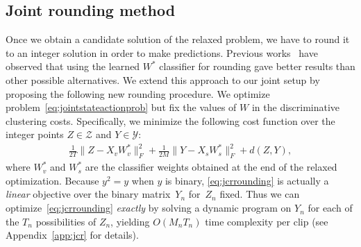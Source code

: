 \subsection{Joint rounding method}
\label{sec:rounding}
Once we obtain a candidate solution of the relaxed problem, we have to round it to an integer solution in order to make predictions.
Previous works~\cite{Alayrac15Unsupervised,Bojanowski15weakly} have observed that using the learned $W^*$ classifier for rounding gave better results than other possible alternatives. We extend this approach to our joint setup by proposing the following new rounding procedure. 
We optimize problem~\eqref{eq:jointstateactionprob} but fix the values of $W$ in the discriminative clustering costs. 
Specifically, we minimize the following cost function over the integer points $Z\in \mathcal{Z}$ and $Y \in \mathcal{Y}$:
\begin{align}
\label{eq:jcrrounding}
\!\!\!\!\!\frac{1}{2T} \|Z - X_{v} W^*_{v}\|_F^2 +  \frac{1}{2M} \|Y - X_{s} W^*_{s}\|_F^2 +  d(Z, Y), \!\!
\end{align}
where $W^*_{v}$ and $W^*_{s}$ are the classifier weights obtained at the end of the relaxed optimization.
Because $y^2 = y$ when $y$ is binary, \eqref{eq:jcrrounding} is actually a \emph{linear} objective over the binary matrix~$Y_n$ for~$Z_n$ fixed.
Thus we can optimize~\eqref{eq:jcrrounding} \emph{exactly} by solving a dynamic program on $Y_n$ for each of the $T_n$ possibilities of $Z_n$, yielding $O(M_n T_n)$ time complexity per clip (see Appendix~\ref{app:jcr} for details).



